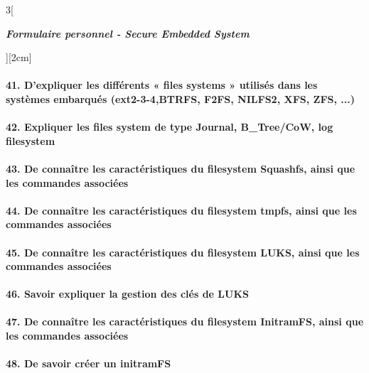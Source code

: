 \begin{multicols}{3}[\centerline{ \large\em \textbf{Formulaire personnel - Secure Embedded System}}][2cm]
\paragraph*{41. D’expliquer les différents « files systems » utilisés dans les systèmes embarqués (ext2-3-4,BTRFS, F2FS, NILFS2, XFS, ZFS, ...)\\}
\paragraph*{42. Expliquer les files system de type Journal, B\_Tree/CoW, log filesystem\\}
\paragraph*{43. De connaître les caractéristiques du filesystem Squashfs, ainsi que les commandes associées\\}
\paragraph*{44. De connaître les caractéristiques du filesystem tmpfs, ainsi que les commandes associées\\}
\paragraph*{45. De connaître les caractéristiques du filesystem LUKS, ainsi que les commandes associées\\}
\paragraph*{46. Savoir expliquer la gestion des clés de LUKS\\}
\paragraph*{47. De connaître les caractéristiques du filesystem InitramFS, ainsi que les commandes associées\\}
\paragraph*{48. De savoir créer un initramFS\\}
\begin{minipage}{\linewidth}
	\centering
\end{minipage}\\


\end{multicols}
